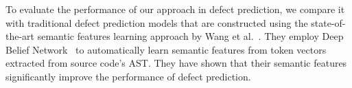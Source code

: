 
To evaluate the performance of our approach in defect prediction, we compare it with traditional defect prediction models that are constructed using the state-of-the-art semantic features learning approach by Wang et al.~\cite{wang2016automatically}. They employ Deep Belief Network~\cite{hinton2009deep} to automatically learn semantic features from token vectors extracted from source code's AST. They have shown that their semantic features significantly improve the performance of defect prediction. 


